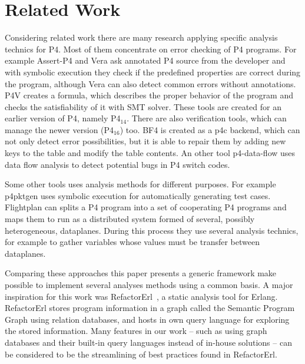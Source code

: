 \documentclass[sigconf]{acmart}
\begin{document}
	\section{Related Work}
	\label{sec:related}
	
	
	Considering related work there are many research applying specific analysis technics for P4. Most of them concentrate on error checking of P4 programs. For example Assert-P4 \cite{assertp4} and Vera \cite{vera} ask annotated P4 source from the developer and with symbolic execution they check if the predefined properties are correct during the program, although Vera can also detect common errors without annotations. P4V \cite{p4v} creates a formula, which describes the proper behavior of the program and checks the satisfiability of it with SMT solver. These tools are created for an earlier version of P4, namely P4$_\text{14}$. There are also verification tools, which can manage the newer version (P4$_\text{16}$) too. BF4 \cite{bf4} is created as a p4c backend, which can not only detect error possibilities, but it is able to repair them by adding new keys to the table and modify the table contents. An other tool p4-data-flow \cite{p4dataflow} uses data flow analysis to detect potential bugs in P4 switch codes.
	
	Some other tools uses analysis methods for different purposes. For example p4pktgen \cite{p4pktgen} uses symbolic execution for automatically generating test cases. Flightplan \cite{flightplan} can splits a P4 program into a set of cooperating P4 programs and maps them to run as a distributed system formed of several, possibly heterogeneous, dataplanes. During this process they use several analysis technics, for example to gather variables whose values must be transfer between dataplanes. 

	Comparing these approaches this paper presents a generic framework make possible to implement several analyses methods using a common basis. A major inspiration for this work was RefactorErl~\cite{referl}, a static analysis tool for Erlang. RefactorErl stores program information in a graph called the Semantic Program Graph using relation databases, and hosts in own query language for exploring the stored information. Many features in our work -- such as using graph databases and their built-in query languages instead of in-house solutions -- can be considered to be the streamlining of best practices found in RefactorErl.
\end{document}
